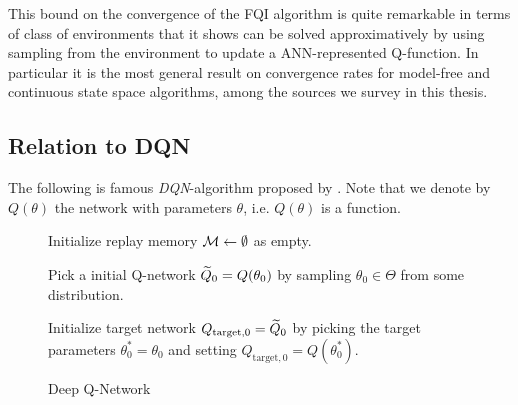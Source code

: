 This bound on the convergence of the FQI algorithm
is quite remarkable in terms of class
of environments that it shows can be solved approximatively by using
sampling from the environment to update a ANN-represented Q-function.
In particular it is the most general result on convergence rates for
model-free and continuous state space algorithms,
among the sources we survey in this thesis.

\subsection{Relation to DQN}

The following is famous \emph{DQN}-algorithm proposed by .
Note that we denote by $Q(\theta)$ the network with parameters $\theta$,
i.e. $Q(\theta)$ is a function.
\begin{figure}[H]
\begin{algorithm}[H] %
  \caption{Deep Q-Network}

  Initialize replay memory $\mathcal{M} \leftarrow \emptyset$ as empty.

  Pick a initial Q-network $\widetilde{Q}_0 = Q(\theta_0)$ by sampling
  $\theta_0 \in \Theta$ from some distribution.

  Initialize target network $Q_{\mathrm{target}, 0} = \widetilde{Q}_0$ by picking
  the target parameters $\theta^*_0 = \theta_0$ and setting
  $Q_{\mathrm{target}, 0} = Q(\theta^*_0)$.

\end{algorithm}
\end{figure}
